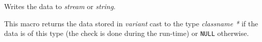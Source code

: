 

Writes the data to {\it stream} or {\it string}.


\label{wxgetvariantcast}


This macro returns the data stored in {\it variant} cast to the type {\it classname *} if
the data is of this type (the check is done during the run-time) or
{\tt NULL} otherwise.



\\

